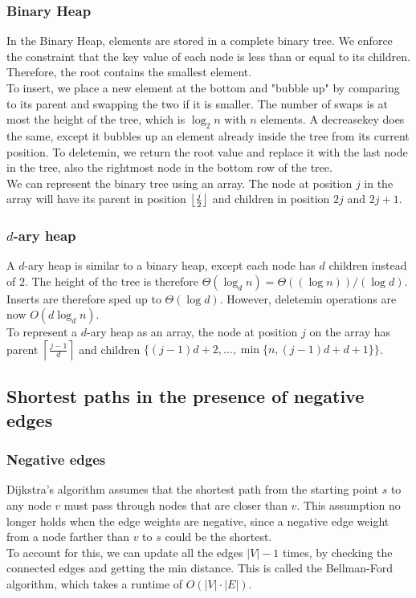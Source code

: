 \subsubsection{Binary Heap}
In the Binary Heap, elements are stored in a complete binary tree.
We enforce the constraint that the key value of each node is less than or equal to its children.
Therefore, the root contains the smallest element. \\
To insert, we place a new element at the bottom and "bubble up" by comparing to its parent and swapping the two if it is smaller.
The number of swaps is at most the height of the tree, which is $\log_2 n$ with $n$ elements.
A decreasekey does the same, except it bubbles up an element already inside the tree from its current position.
To deletemin, we return the root value and replace it with the last node in the tree, also the rightmost node in the bottom row of the tree.\\
We can represent the binary tree using an array.
The node at position $j$ in the array will have its parent in position $\left\lfloor{\frac{j}{2}}\right\rfloor$ and children in position $2j$ and $2j + 1$.

\subsubsection{$d$-ary heap}
A $d$-ary heap is similar to a binary heap, except each node has $d$ children instead of $2$.
The height of the tree is therefore $\Theta(\log_d n) = \Theta ((\log n)) / (\log d)$.
Inserts are therefore sped up to $\Theta(\log d)$.
However, deletemin operations are now $O(d \log_d n)$. \\
To represent a $d$-ary heap as an array, the node at position $j$ on the array has parent $\left\lceil \frac{j-1}{d} \right\rceil$ and children $\{(j-1)d + 2, \ldots, \min\{n, (j-1)d + d + 1\}\}$.

\subsection{Shortest paths in the presence of negative edges}
\subsubsection{Negative edges}
Dijkstra's algorithm assumes that the shortest path from the starting point $s$ to any node $v$ must pass through nodes that are closer than $v$.
This assumption no longer holds when the edge weights are negative, since a negative edge weight from a node farther than $v$ to $s$ could be the shortest.\\
To account for this, we can update all the edges $|V| - 1$ times, by checking the connected edges and getting the min distance.
This is called the Bellman-Ford algorithm, which takes a runtime of $O(|V| \cdot |E|)$.

